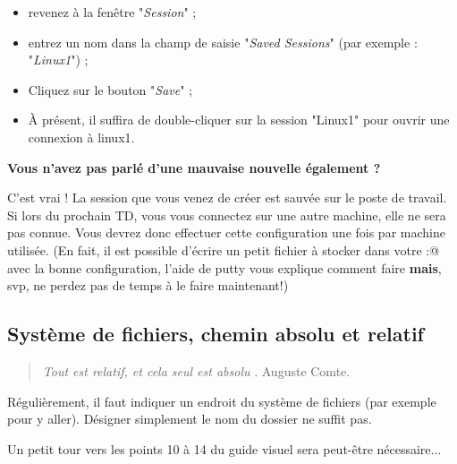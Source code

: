 \documentclass[a4paper,11pt]{article}
\begin{document}
\par

\begin{itemize}
	
	\item revenez \`a la fen\^etre "\textit{Session}" ;
	\item 
	entrez un nom dans la champ de saisie "\textit{Saved Sessions}" 
	(par exemple : "\textit{Linux1}") ;
	
	\item Cliquez sur le bouton "\textit{Save}" ; 
	\item \`A pr\'esent, il suffira de double-cliquer sur la session "Linux1" pour ouvrir une connexion \`a linux1.
\end{itemize}
\textbf{Vous n'avez pas parl\'e d'une mauvaise nouvelle \'egalement ?}
\par

C'est vrai !
La session que vous venez de cr\'eer est sauv\'ee sur le poste de travail.
Si lors du prochain TD, vous vous connectez sur une autre machine, elle ne sera pas connue.
Vous devrez donc effectuer cette configuration une fois par machine utilis\'ee. 
(En fait, il est possible d'\'ecrire un petit fichier \`a stocker dans votre 
\verb@Z:@ avec la bonne configuration,
l'aide de putty vous explique comment faire \textbf{mais}, svp, ne perdez pas de temps \`a le faire maintenant!)   

\par
\newpage
\subsection{Syst\`eme de fichiers, chemin absolu et relatif}
\begin{quotation}
	\guillemotleft \textit{ Tout est relatif, et cela seul est absolu }\guillemotright . Auguste Comte.
\end{quotation}  
R\'eguli\`erement, il faut indiquer un endroit du syst\`eme de fichiers (par exemple pour y aller). 
D\'esigner simplement le nom du dossier ne suffit pas.  

\par

Un petit tour vers les points 10 \`a 14 du guide visuel sera peut-\^etre n\'ecessaire...  

\par
\end{document}
